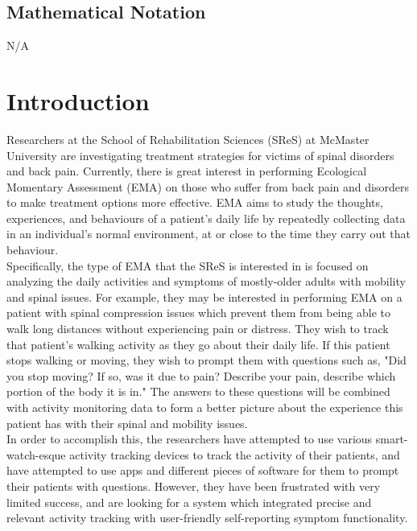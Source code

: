 \documentclass[12pt]{article}
\begin{document}
\subsection{Mathematical Notation}
N/A


\section{Introduction}
\label{Intro}

Researchers at the School of Rehabilitation Sciences (SReS) at McMaster University are investigating treatment strategies for victims of spinal disorders and back pain. Currently, there is great interest in performing Ecological Momentary Assessment (EMA) on those who suffer from back pain and disorders to make treatment options more effective. EMA aims to study the thoughts, experiences, and behaviours of a patient's daily life by repeatedly collecting data in an individual's normal environment, at or close to the time they carry out that behaviour.\\

Specifically, the type of EMA that the SReS is interested in is focused on analyzing the daily activities and symptoms of mostly-older adults with mobility and spinal issues. For example, they may be interested in performing EMA on a patient with spinal compression issues which prevent them from being able to walk long distances without experiencing pain or distress. They wish to track that patient's walking activity as they go about their daily life. If this patient stops walking or moving, they wish to prompt them with questions such as, "Did you stop moving? If so, was it due to pain? Describe your pain, describe which portion of the body it is in." The answers to these questions will be combined with activity monitoring data to form a better picture about the experience this patient has with their spinal and mobility issues.\\

In order to accomplish this, the researchers have attempted to use various smart-watch-esque activity tracking devices to track the activity of their patients, and have attempted to use apps and different pieces of software for them to prompt their patients with questions. However, they have been frustrated with very limited success, and are looking for a system which integrated precise and relevant activity tracking with user-friendly self-reporting symptom functionality.\\
\end{document}
